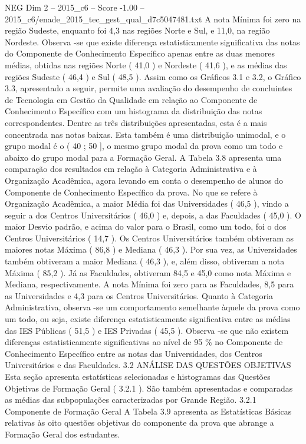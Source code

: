 \begin{textsample}{NEG Dim 2 – 2015\_c6 – Score -1.00 – 2015\_c6/enade\_2015\_tec\_gest\_qual\_d7c5047481.txt}
A nota Mínima foi zero na região Sudeste, enquanto foi 4,3 nas regiões Norte e Sul, e 11,0, na região Nordeste.
Observa -se que existe diferença estatisticamente significativa das notas do Componente de Conhecimento Específico apenas entre as duas menores médias, obtidas nas regiões Norte ( 41,0 ) e Nordeste ( 41,6 ), e as médias das regiões Sudeste ( 46,4 ) e Sul ( 48,5 ).
Assim como os Gráficos 3.1 e 3.2, o Gráfico 3.3, apresentado a seguir, permite uma avaliação do desempenho de concluintes de Tecnologia em Gestão da Qualidade em relação ao Componente de Conhecimento Específico com um histograma da distribuição das notas correspondentes.
Dentre as três distribuições apresentadas, esta é a mais concentrada nas notas baixas.
Esta também é uma distribuição unimodal, e o grupo modal é o ( 40 ; 50 ], o mesmo grupo modal da prova como um todo e abaixo do grupo modal para a Formação Geral.
A Tabela 3.8 apresenta uma comparação dos resultados em relação à Categoria Administrativa e à Organização Acadêmica, agora levando em conta o desempenho de alunos do Componente de Conhecimento Específico da prova.
No que se refere à Organização Acadêmica, a maior Média foi das Universidades ( 46,5 ), vindo a seguir a dos Centros Universitários ( 46,0 ) e, depois, a das Faculdades ( 45,0 ).
O maior Desvio padrão, e acima do valor para o Brasil, como um todo, foi o dos Centros Universitários ( 14,7 ).
Os Centros Universitários também obtiveram as maiores notas Máxima ( 86,8 ) e Mediana ( 46,3 ).
Por sua vez, as Universidades também obtiveram a maior Mediana ( 46,3 ), e, além disso, obtiveram a nota Máxima ( 85,2 ).
Já as Faculdades, obtiveram 84,5 e 45,0 como nota Máxima e Mediana, respectivamente.
A nota Mínima foi zero para as Faculdades, 8,5 para as Universidades e 4,3 para os Centros Universitários.
Quanto à Categoria Administrativa, observa -se um comportamento semelhante àquele da prova como um todo, ou seja, existe diferença estatisticamente significativa entre as médias das IES Públicas ( 51,5 ) e IES Privadas ( 45,5 ).
Observa -se que não existem diferenças estatisticamente significativas ao nível de 95 \% no Componente de Conhecimento Específico entre as notas das Universidades, dos Centros Universitários e das Faculdades. 3.2 ANÁLISE DAS QUESTÕES OBJETIVAS Esta seção apresenta estatísticas selecionadas e histogramas das Questões Objetivas de Formação Geral ( 3.2.1 ).
São também apresentadas e comparadas as médias das subpopulações caracterizadas por Grande Região. 3.2.1 Componente de Formação Geral A Tabela 3.9 apresenta as Estatísticas Básicas relativas às oito questões objetivas do componente da prova que abrange a Formação Geral dos estudantes.

\end{textsample}
